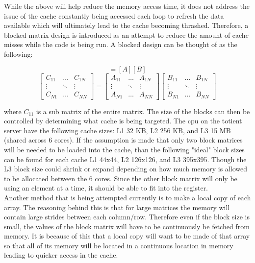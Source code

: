 \documentclass{article}
\begin{document}
While the above will help reduce the memory access time, it does not address the issue of the cache constantly being accessed each loop to refresh the data available which will ultimately lead to the cache becoming thrashed. Therefore, a blocked matrix design is introduced as an attempt to reduce the amount of cache misses while the code is being run. A blocked design can be thought of as the following:

\begin{equation*}
 [C] = [A][B]
 \end{equation*}
 \begin{equation*}
\begin{bmatrix}
C_{11} & \hdots & C_{1N} \\
\vdots & \ddots & \vdots \\
C_{N1} & \hdots & C_{NN}
\end{bmatrix} = \begin{bmatrix}
A_{11} & \hdots & A_{1N} \\
\vdots & \ddots & \vdots \\
A_{N1} & \hdots & A_{NN}
\end{bmatrix} \begin{bmatrix}
B_{11} & \hdots & B_{1N} \\
\vdots & \ddots & \vdots \\
B_{N1} & \hdots & B_{NN}
\end{bmatrix}
\end{equation*}

\noindent where $C_{11}$ is a sub matrix of the entire matrix. The size of the blocks can then be controlled by determining what cache is being targeted. The cpu on the totient server have the following cache sizes: L1 32 KB, L2 256 KB, and L3 15 MB (shared across 6 cores). If the assumption is made that only two block matrices will be needed to be loaded into the cache, than the following "ideal" block sizes can be found for each cache L1  44x44, L2 126x126, and L3 395x395. Though the L3 block size could shrink or expand depending on how much memory is allowed to be allocated between the 6 cores. Since the other block matrix will only be using an element at a time, it should be able to fit into the register.\\

Another method that is being attempted currently is to make a local copy of each array. The reasoning behind this is that for large matrices the memory will contain large strides between each column/row. Therefore even if the block size is small, the values of the block matrix will have to be continuously be fetched from memory. It is because of this that a local copy will want to be made of that array so that all of its memory will be located in a continuous location in memory leading to quicker access in the cache.
\end{document}

